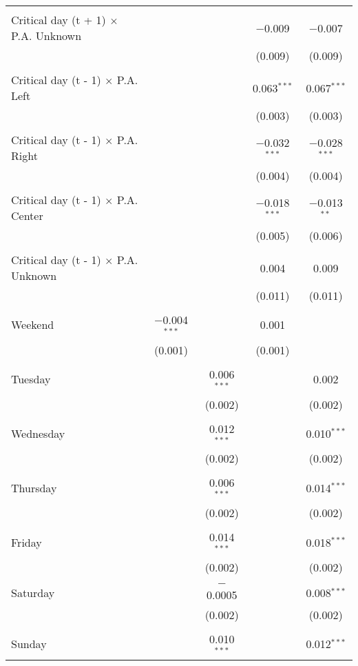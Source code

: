 \documentclass[
]{article}
\begin{document}
\begin{table}[!htbp]
{\begin{tabular}{@{\extracolsep{5pt}}lcccc}
  & & & & \\ 
 Critical day (t + 1) $\times$ P.A. Unknown &  &  & $-$0.009 & $-$0.007 \\ 
  &  &  & (0.009) & (0.009) \\ 
  & & & & \\ 
 Critical day (t - 1) $\times$ P.A. Left &  &  & 0.063$^{***}$ & 0.067$^{***}$ \\ 
  &  &  & (0.003) & (0.003) \\ 
  & & & & \\ 
 Critical day (t - 1) $\times$ P.A. Right &  &  & $-$0.032$^{***}$ & $-$0.028$^{***}$ \\ 
  &  &  & (0.004) & (0.004) \\ 
  & & & & \\ 
 Critical day (t - 1) $\times$ P.A. Center &  &  & $-$0.018$^{***}$ & $-$0.013$^{**}$ \\ 
  &  &  & (0.005) & (0.006) \\ 
  & & & & \\ 
 Critical day (t - 1) $\times$ P.A. Unknown &  &  & 0.004 & 0.009 \\ 
  &  &  & (0.011) & (0.011) \\ 
  & & & & \\ 
 Weekend & $-$0.004$^{***}$ &  & 0.001 &  \\ 
  & (0.001) &  & (0.001) &  \\ 
  & & & & \\ 
 Tuesday &  & 0.006$^{***}$ &  & 0.002 \\ 
  &  & (0.002) &  & (0.002) \\ 
  & & & & \\ 
 Wednesday &  & 0.012$^{***}$ &  & 0.010$^{***}$ \\ 
  &  & (0.002) &  & (0.002) \\ 
  & & & & \\ 
 Thursday &  & 0.006$^{***}$ &  & 0.014$^{***}$ \\ 
  &  & (0.002) &  & (0.002) \\ 
  & & & & \\ 
 Friday &  & 0.014$^{***}$ &  & 0.018$^{***}$ \\ 
  &  & (0.002) &  & (0.002) \\ 
  & & & & \\ 
 Saturday &  & $-$0.0005 &  & 0.008$^{***}$ \\ 
  &  & (0.002) &  & (0.002) \\ 
  & & & & \\ 
 Sunday &  & 0.010$^{***}$ &  & 0.012$^{***}$ \\ 

\end{tabular}}
\end{table}
\end{document}

